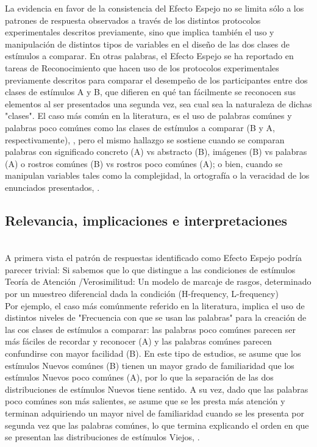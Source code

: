 La evidencia en favor de la consistencia del Efecto Espejo no se limita sólo a los patrones de respuesta observados a través de los distintos protocolos experimentales descritos previamente, sino que implica también el uso y manipulación de distintos tipos de variables en el diseño de las dos clases de estímulos a comparar. En otras palabras, el Efecto Espejo se ha reportado en tareas de Reconocimiento que hacen uso de los protocolos experimentales previamente descritos para comparar el desempeño de los participantes entre dos clases de estímulos A y B, que difieren en qué tan fácilmente se reconocen sus elementos al ser presentados una segunda vez, sea cual sea la naturaleza de dichas "clases". El caso más común en la literatura, es el uso de palabras comúnes y palabras poco comúnes como las clases de estímulos a comparar (B y A, respectivamente), \parencite{Glanzer1990}, pero el mismo hallazgo se sostiene cuando se comparan palabras con significado concreto (A) vs abstracto (B), imágenes (B) vs palabras (A) o rostros comúnes (B) vs rostros poco comúnes (A); o bien, cuando se manipulan variables tales como la complejidad, la ortografía o la veracidad de los enunciados presentados, \parencite{Glanzer1993}.\\

\subsection{Relevancia, implicaciones e interpretaciones}\\

A primera vista el patrón de respuestas identificado como Efecto Espejo podría parecer trivial: Si sabemos que lo que distingue a las condiciones de estímulos \\


Teoría de Atención /Verosimilitud: Un modelo de marcaje de rasgos, determinado por un muestreo diferencial dada la condición (H-frequency, L-frequency)\\

Por ejemplo, el caso más comúnmente referido en la literatura, implica el uso de distintos niveles de "Frecuencia con que se usan las palabras" para la creación de las cos clases de estímulos a comparar: las palabras poco comúnes parecen ser más fáciles de recordar y reconocer (A) y las palabras comúnes parecen confundirse con mayor facilidad (B). En este tipo de estudios, se asume que los estímulos Nuevos comúnes (B) tienen un mayor grado de familiaridad que los estímulos Nuevos poco comúnes (A), por lo que la separación de las dos distribuciones de estímulos Nuevos tiene sentido. A su vez, dado que las palabras poco comúnes son más salientes, se asume que se les presta más atención y terminan adquiriendo un mayor nivel de familiaridad cuando se les presenta por segunda vez que las palabras comúnes, lo que termina explicando el orden en que se presentan las distribuciones de estímulos Viejos, \parencite{Glanzer1993}. \\



